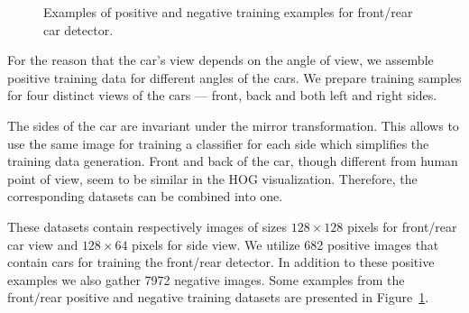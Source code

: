 \begin{figure}[b]
\hspace{2mm}
\hspace{2mm}
\hspace{2mm}
\hspace{2mm}
\caption{Examples of positive and negative training examples for front/rear car detector.}
\label{fig:pos_neg_examples}
\end{figure}

For the reason that the car's view depends on the angle of view, we assemble
positive training data for different angles of the cars. We prepare training
samples for four distinct views of the cars --- front, back and both left and
right sides.

The sides of the car are invariant under the mirror transformation. This
allows to use the same image for training a classifier for each side which
simplifies the training data generation. Front and back of the car, though
different from human point of view, seem to be similar in the HOG
visualization. Therefore, the corresponding datasets can be combined into one.

These datasets contain respectively images of sizes $128 \times 128$ pixels
for front/rear car view and $128 \times 64$ pixels for side view. We utilize
682 positive images that contain cars for training the front/rear detector. In
addition to these positive examples we also gather 7972 negative images. Some
examples from the front/rear positive and negative training datasets are
presented in Figure~\ref{fig:pos_neg_examples}.

